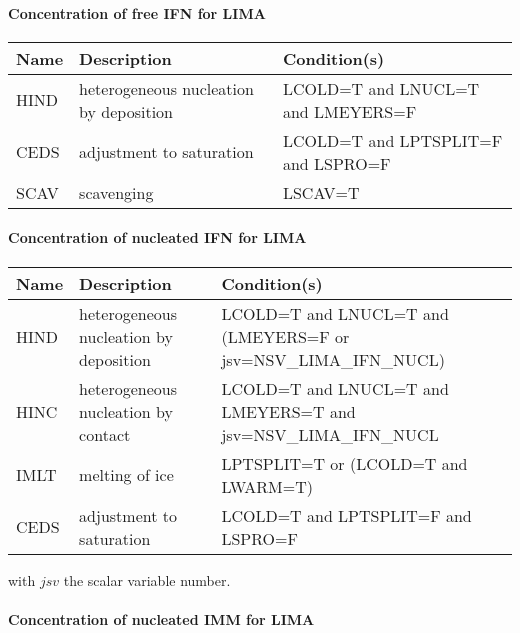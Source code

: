 \paragraph{Concentration of free IFN for LIMA}
\mbox{} %

\begin{longtable} {|p{}|p{}|p{}|}
\hline
Name & Description & Condition(s) \\
\hline \hline
\endhead
HIND   & heterogeneous nucleation by deposition & LCOLD=T and LNUCL=T and LMEYERS=F \\\hline
CEDS   & adjustment to saturation               & LCOLD=T and LPTSPLIT=F and LSPRO=F \\\hline
SCAV   & scavenging                             & LSCAV=T \\\hline
\end{longtable}

\paragraph{Concentration of nucleated IFN for LIMA}
\mbox{} %

\begin{longtable} {|p{}|p{}|p{}|}
\hline
Name & Description & Condition(s) \\
\hline \hline
\endhead
HIND   & heterogeneous nucleation by deposition & LCOLD=T and LNUCL=T and (LMEYERS=F or jsv=NSV\_LIMA\_IFN\_NUCL) \\\hline
HINC   & heterogeneous nucleation by contact    & LCOLD=T and LNUCL=T and LMEYERS=T and jsv=NSV\_LIMA\_IFN\_NUCL \\\hline
IMLT   & melting of ice                         & LPTSPLIT=T or (LCOLD=T and LWARM=T) \\\hline
CEDS   & adjustment to saturation               & LCOLD=T and LPTSPLIT=F and LSPRO=F \\\hline
\end{longtable}

with $jsv$ the scalar variable number.

\paragraph{Concentration of nucleated IMM for LIMA}
\mbox{} %

